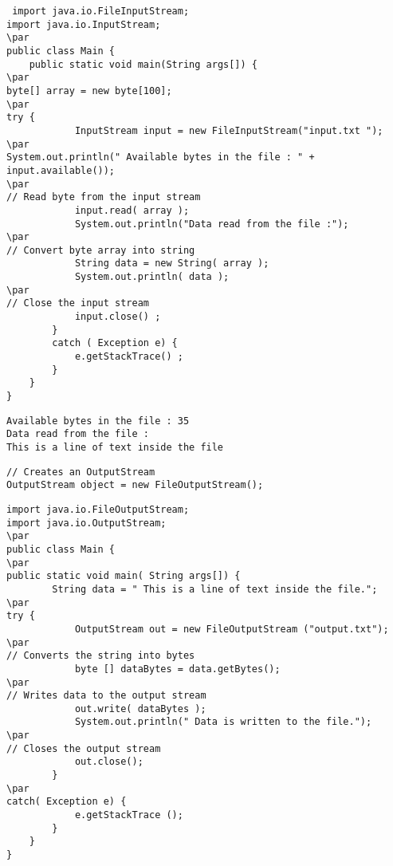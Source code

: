 \documentclass{book}
\def\lthtmlcheckvsize{\ifdim\ht\sizebox<\vsize 
  \ifdim\wd\sizebox<\hsize\expandafter\hfill\fi \expandafter\vfill
  \else\expandafter\vss\fi}%
\begin{document}
{\newpage\clearpage
{}%
\begin{lstlisting}
 import java.io.FileInputStream;
import java.io.InputStream;
\par
public class Main {
	public static void main(String args[]) {
\par
byte[] array = new byte[100];
\par
try {
			InputStream input = new FileInputStream("input.txt ");
\par
System.out.println(" Available bytes in the file : " + input.available());
\par
// Read byte from the input stream
			input.read( array );
			System.out.println("Data read from the file :");
\par
// Convert byte array into string
			String data = new String( array );
			System.out.println( data );
\par
// Close the input stream
			input.close() ;
		}
		catch ( Exception e) {
			e.getStackTrace() ;
		}
	}
}
\end{lstlisting}%
\lthtmlfigureZ
\lthtmlcheckvsize\clearpage}

{\newpage\clearpage
{}%
\begin{lstlisting}
Available bytes in the file : 35
Data read from the file :
This is a line of text inside the file
\end{lstlisting}%
\lthtmlfigureZ
\lthtmlcheckvsize\clearpage}

{\newpage\clearpage
{}%
\begin{lstlisting}
// Creates an OutputStream
OutputStream object = new FileOutputStream();
\end{lstlisting}%
\lthtmlfigureZ
\lthtmlcheckvsize\clearpage}

{\newpage\clearpage
{}%
\begin{lstlisting}
import java.io.FileOutputStream;
import java.io.OutputStream;
\par
public class Main {
\par
public static void main( String args[]) {
		String data = " This is a line of text inside the file.";
\par
try {
			OutputStream out = new FileOutputStream ("output.txt");
\par
// Converts the string into bytes
			byte [] dataBytes = data.getBytes();
\par
// Writes data to the output stream
			out.write( dataBytes );
			System.out.println(" Data is written to the file.");
\par
// Closes the output stream
			out.close();
		}
\par
catch( Exception e) {
			e.getStackTrace ();
		}
	}
}
\end{lstlisting}%
\lthtmlfigureZ
\lthtmlcheckvsize\clearpage}
\end{document}
